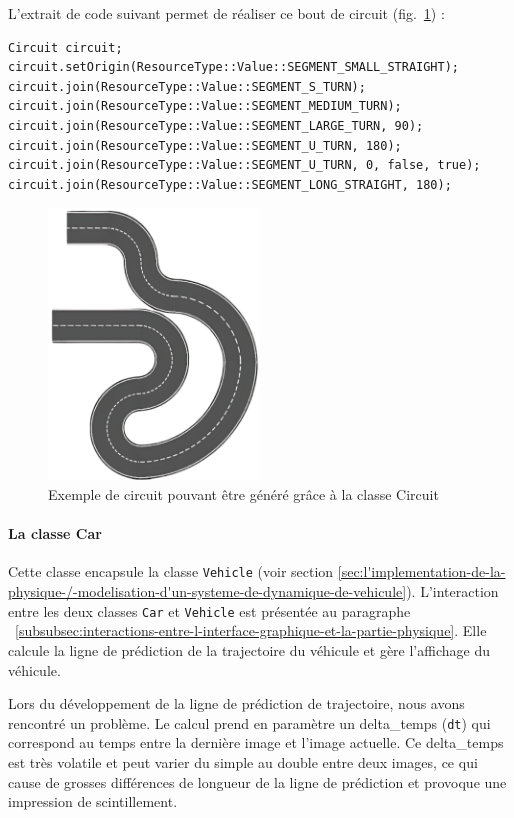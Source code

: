 L'extrait de code suivant permet de réaliser ce bout de circuit (fig.~\ref{fig:example_circuit_1}) :
\begin{lstlisting}[style=CStyle, label={lst:code_circuit}]
Circuit circuit;
circuit.setOrigin(ResourceType::Value::SEGMENT_SMALL_STRAIGHT);
circuit.join(ResourceType::Value::SEGMENT_S_TURN);
circuit.join(ResourceType::Value::SEGMENT_MEDIUM_TURN);
circuit.join(ResourceType::Value::SEGMENT_LARGE_TURN, 90);
circuit.join(ResourceType::Value::SEGMENT_U_TURN, 180);
circuit.join(ResourceType::Value::SEGMENT_U_TURN, 0, false, true);
circuit.join(ResourceType::Value::SEGMENT_LONG_STRAIGHT, 180);
\end{lstlisting}

\begin{figure}[h]
    \centering
    \includegraphics[width=0.5\textwidth]{resources/example_circuit_1}
    \caption{Exemple de circuit pouvant être généré grâce à la classe Circuit}
    \label{fig:example_circuit_1}
\end{figure}

\paragraph[Car]{La classe \textbf{Car}}
Cette classe encapsule la classe \texttt{Vehicle} (voir section \ref{sec:l'implementation-de-la-physique-/-modelisation-d'un-systeme-de-dynamique-de-vehicule}).
L'interaction entre les deux classes \texttt{Car} et \texttt{Vehicle} est présentée au paragraphe ~\ref{subsubsec:interactions-entre-l-interface-graphique-et-la-partie-physique}.
Elle calcule la ligne de prédiction de la trajectoire du véhicule et gère l'affichage du véhicule.

Lors du développement de la ligne de prédiction de trajectoire, nous avons rencontré un problème.
Le calcul prend en paramètre un \gls{delta_temps} (\texttt{dt}) qui correspond au temps entre la dernière image et l'image actuelle.
Ce \gls{delta_temps} est très volatile et peut varier du simple au double entre deux images, ce qui cause de grosses différences de longueur de la ligne de prédiction et provoque une impression de scintillement.

